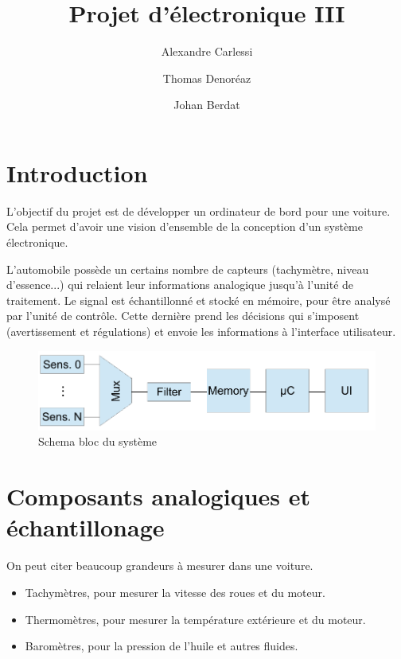 \documentclass[a4paper]{article} %
\begin{document}
\title{Projet d'électronique III}
\author{Alexandre Carlessi \and Thomas Denoréaz \and Johan Berdat}

\maketitle

\tableofcontents

\section{Introduction}

L'objectif du projet est de développer un ordinateur de bord pour une voiture.
Cela permet d'avoir une vision d'ensemble de la conception d'un système électronique.

L'automobile possède un certains nombre de capteurs (tachymètre, niveau d'essence...) qui relaient leur informations analogique jusqu'à l'unité de traitement.
Le signal est échantillonné et stocké en mémoire, pour être analysé par l'unité de contrôle.
Cette dernière prend les décisions qui s'imposent (avertissement et régulations) et envoie les informations à l'interface utilisateur.

\begin{figure}[h!]
	\centering
	\includegraphics[scale=0.8]{global.pdf}
	\caption{Schema bloc du système}
\end{figure}


\section{Composants analogiques et échantillonage}

On peut citer beaucoup grandeurs à mesurer dans une voiture.
\begin{itemize}
\item
	Tachymètres, pour mesurer la vitesse des roues et du moteur.
\item
	Thermomètres, pour mesurer la température extérieure et du moteur.
\item
	Baromètres, pour la pression de l'huile et autres fluides.
\end{itemize}
\end{document}
